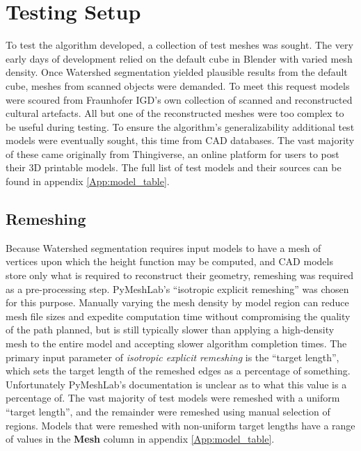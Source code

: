 
\section{Testing Setup}

To test the algorithm developed, a collection of test meshes was sought.
The very early days of development relied on the default cube in Blender with varied mesh density.
Once Watershed segmentation yielded plausible results from the default cube, meshes from scanned objects were demanded.
To meet this request models were scoured from Fraunhofer IGD's own collection of scanned and reconstructed cultural artefacts.
All but one of the reconstructed meshes were too complex to be useful during testing.
To ensure the algorithm's generalizability additional test models were eventually sought, this time from CAD databases.
The vast majority of these came originally from Thingiverse, an online platform for users to post their 3D printable models\cite{Thingiverse}.
The full list of test models and their sources can be found in appendix \ref{App:model_table}.

\subsection{Remeshing}
Because Watershed segmentation requires input models to have a mesh of vertices upon which the height function may be computed, and CAD models store only what is required to reconstruct their geometry, remeshing was required as a pre-processing step.
PyMeshLab's ``isotropic explicit remeshing''\cite{PyMeshLab} was chosen for this purpose.
Manually varying the mesh density by model region can reduce mesh file sizes and expedite computation time without compromising the quality of the path planned, but is still typically slower than applying a high-density mesh to the entire model and accepting slower algorithm completion times.
The primary input parameter of \textit{isotropic explicit remeshing} is the ``target length'', which sets the target length of the remeshed edges as a percentage of something.
Unfortunately PyMeshLab's documentation is unclear as to what this value is a percentage of.
The vast majority of test models were remeshed with a uniform ``target length'', and the remainder were remeshed using manual selection of regions.
Models that were remeshed with non-uniform target lengths have a range of values in the \textbf{Mesh} column in appendix \ref{App:model_table}.

